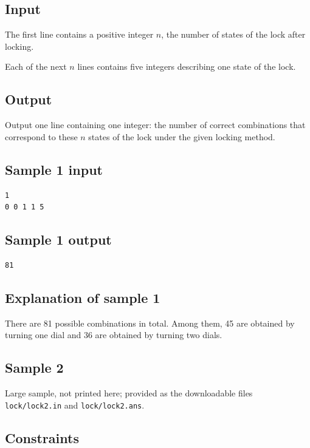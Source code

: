 \documentclass[11pt]{article}
\begin{document}
\subsection*{Input}

The first line contains a positive integer $n$, the number of states of
the lock after locking.

Each of the next $n$ lines contains five integers describing one state of
the lock.

\subsection*{Output}

Output one line containing one integer: the number of correct
combinations that correspond to these $n$ states of the lock under the
given locking method.

\subsection*{Sample 1 input}

\begin{verbatim}
1
0 0 1 1 5
\end{verbatim}

\subsection*{Sample 1 output}

\begin{verbatim}
81
\end{verbatim}

\subsection*{Explanation of sample 1}

There are 81 possible combinations in total.
Among them, 45 are obtained by turning one dial and 36 are obtained by
turning two dials.

\subsection*{Sample 2}

Large sample, not printed here;
provided as the downloadable files \texttt{lock/lock2.in} and \texttt{lock/lock2.ans}.

\subsection*{Constraints}
\end{document}
